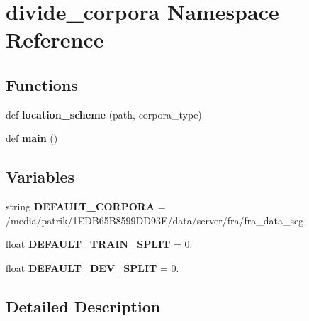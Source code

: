 \hypertarget{namespacedivide__corpora}{}\section{divide\+\_\+corpora Namespace Reference}
\label{namespacedivide__corpora}
\subsection*{Functions}
\begin{DoxyCompactItemize}
\item 
def {\bfseries location\+\_\+scheme} (path, corpora\+\_\+type)\hypertarget{namespacedivide__corpora_a04bafdf479caf9c45d70a261196ff354}{}\label{namespacedivide__corpora_a04bafdf479caf9c45d70a261196ff354}

\item 
def {\bfseries main} ()\hypertarget{namespacedivide__corpora_a7f0b86b06724d81d32483844829e616d}{}\label{namespacedivide__corpora_a7f0b86b06724d81d32483844829e616d}

\end{DoxyCompactItemize}
\subsection*{Variables}
\begin{DoxyCompactItemize}
\item 
string {\bfseries D\+E\+F\+A\+U\+L\+T\+\_\+\+C\+O\+R\+P\+O\+RA} = \textquotesingle{}/media/patrik/1\+E\+D\+B65\+B8599\+D\+D93\+E/data/server/fra/fra\+\_\+data\+\_\+seg\textquotesingle{}\hypertarget{namespacedivide__corpora_a8aae1bbf0c7a694c6ef0c9074c187259}{}\label{namespacedivide__corpora_a8aae1bbf0c7a694c6ef0c9074c187259}

\item 
float {\bfseries D\+E\+F\+A\+U\+L\+T\+\_\+\+T\+R\+A\+I\+N\+\_\+\+S\+P\+L\+IT} = 0.\hypertarget{namespacedivide__corpora_abc68104b66018331fad9959c41e88580}{}\label{namespacedivide__corpora_abc68104b66018331fad9959c41e88580}

\item 
float {\bfseries D\+E\+F\+A\+U\+L\+T\+\_\+\+D\+E\+V\+\_\+\+S\+P\+L\+IT} = 0.\hypertarget{namespacedivide__corpora_ab3d6b00689741f54484fb32b4294d4b3}{}\label{namespacedivide__corpora_ab3d6b00689741f54484fb32b4294d4b3}

\end{DoxyCompactItemize}


\subsection{Detailed Description}
\begin{DoxyVerb}\end{DoxyVerb}
 